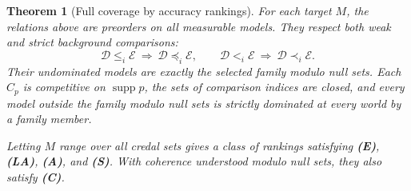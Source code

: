 \documentclass[11pt]{article}
\newtheorem{theorem}{Theorem}
\theoremstyle{remark}
\newcommand{\supp}{\operatorname{supp}}
\newcommand{\Dscr}{\mathcal D}
\newcommand{\Escr}{\mathcal E}
\begin{document}
\begin{theorem}[Full coverage by accuracy rankings]\label{thm:coverage}
For each target $M$, the relations above are preorders on all measurable
models. They respect both weak and strict background comparisons:
\begin{equation}
 \boxed{\quad \Dscr\le_i\Escr\ \Longrightarrow\ \Dscr\preceq_i\Escr,
 \qquad \Dscr<_i\Escr\ \Longrightarrow\ \Dscr\prec_i\Escr.\quad}\label{eq:accuracy}
\end{equation}
Their undominated models are exactly the selected family modulo null sets.
Each $C_{p}$ is competitive on $\supp p$, the sets of comparison indices are closed,
and every model outside the family modulo null sets is strictly dominated at
every world by a family member.

Letting $M$ range over all credal sets gives a class of rankings satisfying
\textbf{(E)}, \textbf{(LA)}, \textbf{(A)}, and \textbf{(S)}. With coherence
understood modulo null sets, they also satisfy \textbf{(C)}.
\end{theorem}
\end{document}
